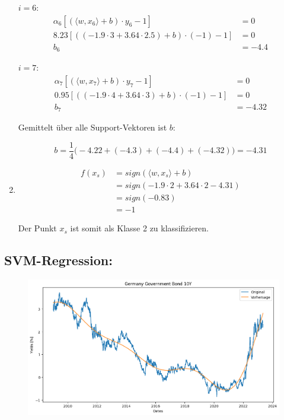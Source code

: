 \documentclass[a4paper,12pt]{article}
\begin{document}
\begin{enumerate}
	$i = 6$:
	\begin{align*}
		\alpha_6 \left[(\langle w, x_6 \rangle + b) \cdot y_6 - 1 \right] &= 0 \\
		8.23 \left[((-1.9 \cdot 3 + 3.64 \cdot 2.5) + b) \cdot (-1) - 1 \right] &= 0 \\
		b_6 &= -4.4
	\end{align*}

	$i = 7$:
	\begin{align*}
		\alpha_7 \left[(\langle w, x_7 \rangle + b) \cdot y_7 - 1 \right] &= 0 \\
		0.95 \left[((-1.9 \cdot 4 + 3.64 \cdot 3) + b) \cdot (-1) - 1 \right] &= 0 \\
		b_7 &= -4.32
	\end{align*}
	
	Gemittelt über alle Support-Vektoren ist $b$:

	\[b = \frac{1}{4} \biggl(-4.22 + (-4.3) + (-4.4) + (-4.32)\biggr) = -4.31 \]
	
	\item

	\begin{align*}
		f(x_s) &= sign(\langle w, x_s\rangle + b) \\
			&= sign(-1.9 \cdot 2 + 3.64 \cdot 2 - 4.31) \\
			&= sign(-0.83) \\
			&= -1 
	\end{align*}

	Der Punkt $x_s$ ist somit als Klasse 2 zu klassifizieren.
\end{enumerate}


\subsection*{SVM-Regression:}

\begin{figure}[H]
	\centering
	\includegraphics[width = .7\linewidth]{aufgabe-3-reg.png}
\end{figure}
\end{document}
